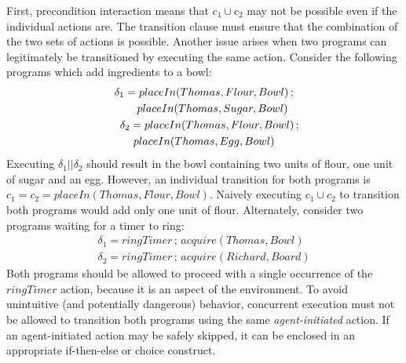 First, precondition interaction means that $c_{1}\cup c_{2}$ may
not be possible even if the individual actions are. The transition
clause must ensure that the combination of the two sets of actions
is possible. Another issue arises when two programs can legitimately
be transitioned by executing the same action. Consider the following
programs which add ingredients to a bowl:\begin{multline*}
\delta_{1}=placeIn(Thomas,Flour,Bowl)\,;\\
\shoveright{placeIn(Thomas,Sugar,Bowl)}\\
\shoveleft{\delta_{2}=placeIn(Thomas,Flour,Bowl)\,;}\\
placeIn(Thomas,Egg,Bowl)\end{multline*}
 Executing $\delta_{1}||\delta_{2}$ should result in the bowl containing
two units of flour, one unit of sugar and an egg. However, an individual
transition for both programs is $c_{1}=c_{2}=placeIn(Thomas,Flour,Bowl)$.
Naively executing $c_{1}\cup c_{2}$ to transition both programs would
add only one unit of flour. Alternately, consider two programs waiting
for a timer to ring:\begin{gather*}
\delta_{1}=ringTimer\,;\, acquire(Thomas,Bowl)\\
\delta_{2}=ringTimer\,;\, acquire(Richard,Board)\end{gather*}
 Both programs should be allowed to proceed with a single occurrence
of the $ringTimer$ action, because it is an aspect of the environment.
To avoid unintuitive (and potentially dangerous) behavior, concurrent
execution must not be allowed to transition both programs using the
same \emph{agent-initiated} action. If an agent-initiated action may
be safely skipped, it can be enclosed in an appropriate if-then-else
or choice construct.

